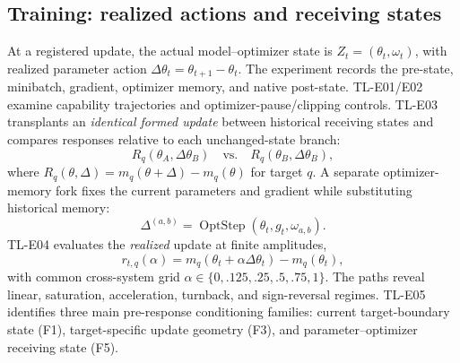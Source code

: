 \documentclass[conference,10pt]{IEEEtran}
\begin{document}
\subsection{Training: realized actions and receiving states}
At a registered update, the actual model--optimizer state is $Z_t=(\theta_t,\omega_t)$, with realized parameter action $\Delta\theta_t=\theta_{t+1}-\theta_t$. The experiment records the pre-state, minibatch, gradient, optimizer memory, and native post-state. TL-E01/E02 examine capability trajectories and optimizer-pause/clipping controls. TL-E03 transplants an \emph{identical formed update} between historical receiving states and compares responses relative to each unchanged-state branch:
\begin{equation}
 R_q(\theta_A,\Delta\theta_B)\quad\text{vs.}\quad R_q(\theta_B,\Delta\theta_B),
 \label{eq:receiver}
\end{equation}
where $R_q(\theta,\Delta)=m_q(\theta+\Delta)-m_q(\theta)$ for target $q$. A separate optimizer-memory fork fixes the current parameters and gradient while substituting historical memory:
\begin{equation}
 \Delta^{(a,b)}=\operatorname{OptStep}(\theta_t,g_t,\omega_{a,b}).
 \label{eq:optmem}
\end{equation}
TL-E04 evaluates the \emph{realized} update at finite amplitudes,
\begin{equation}
 r_{t,q}(\alpha)=m_q(\theta_t+\alpha\Delta\theta_t)-m_q(\theta_t),
 \label{eq:response}
\end{equation}
with common cross-system grid $\alpha\in\{0,.125,.25,.5,.75,1\}$. The paths reveal linear, saturation, acceleration, turnback, and sign-reversal regimes. TL-E05 identifies three main pre-response conditioning families: current target-boundary state (F1), target-specific update geometry (F3), and parameter--optimizer receiving state (F5).
\end{document}
